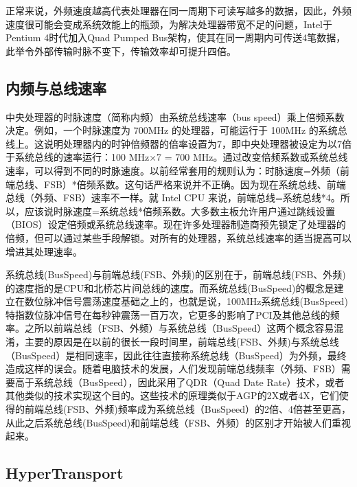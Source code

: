 正常来说，外频速度越高代表处理器在同一周期下可读写越多的数据，因此，外频速度很可能会变成系统效能上的瓶颈，为解决处理器带宽不足的问题，Intel于Pentium 4时代加入Quad Pumped Bus架构，使其在同一周期内可传送4笔数据，此举令外部传输时脉不变下，传输效率却可提升四倍。

\subsection{内频与总线速率}
中央处理器的时脉速度（简称内频）由系统总线速率（bus speed）乘上倍频系数决定。例如，一个时脉速度为 700MHz 的处理器，可能运行于 100MHz 的系统总线上。这说明处理器内的时钟倍频器的倍率设置为7，即中央处理器被设定为以7倍于系统总线的速率运行：100 MHz×7 = 700 MHz。通过改变倍频系数或系统总线速率，可以得到不同的时脉速度。以前经常套用的规则认为：时脉速度=外频（前端总线、FSB）*倍频系数。这句话严格来说并不正确。因为现在系统总线、前端总线（外频、FSB）速率不一样。就 Intel CPU 来说，前端总线=系统总线*4。所以，应该说时脉速度=系统总线*倍频系数。大多数主板允许用户通过跳线设置（BIOS）设定倍频或系统总线速率。现在许多处理器制造商预先锁定了处理器的倍频，但可以通过某些手段解锁。对所有的处理器，系统总线速率的适当提高可以增进其处理速率。

系统总线(BusSpeed)与前端总线(FSB、外频)的区别在于，前端总线(FSB、外频)的速度指的是CPU和北桥芯片间总线的速度。而系统总线(BusSpeed)的概念是建立在数位脉冲信号震荡速度基础之上的，也就是说，100MHz系统总线(BusSpeed)特指数位脉冲信号在每秒钟震荡一百万次，它更多的影响了PCI及其他总线的频率。之所以前端总线（FSB、外频）与系统总线（BusSpeed）这两个概念容易混淆，主要的原因是在以前的很长一段时间里，前端总线(FSB、外频)与系统总线（BusSpeed）是相同速率，因此往往直接称系统总线（BusSpeed）为外频，最终造成这样的误会。随着电脑技术的发展，人们发现前端总线频率（外频、FSB）需要高于系统总线（BusSpeed），因此采用了QDR（Quad Date Rate）技术，或者其他类似的技术实现这个目的。这些技术的原理类似于AGP的2X或者4X，它们使得的前端总线(FSB、外频)频率成为系统总线（BusSpeed）的2倍、4倍甚至更高，从此之后系统总线(BusSpeed)和前端总线（FSB、外频）的区别才开始被人们重视起来。



\subsection{HyperTransport}

